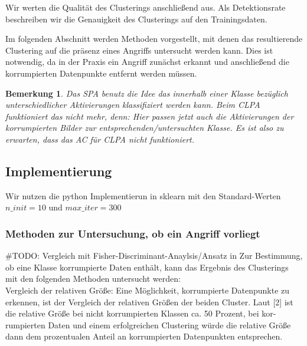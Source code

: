 \documentclass[11pt,a4paper]{article}
\newtheorem{remark}[theorem]{Bemerkung}
\numberwithin{equation}{section}
\begin{document}
		Wir werten die Qualität des Clusterings anschließend aus. Als Detektionsrate
		beschreiben wir die Genauigkeit des Clusterings auf den Trainingsdaten.
		
		Im folgenden Abschnitt werden Methoden vorgestellt, mit denen das resultierende Clustering auf die präsenz eines Angriffs untersucht werden kann. Dies ist notwendig, da in der Praxis ein Angriff zunächst erkannt und anschließend die korrumpierten Datenpunkte entfernt werden müssen. 
		
		\begin{remark}
			Das SPA benutz die Idee das innerhalb einer Klasse bezüglich unterschiedlicher Aktivierungen klassifiziert werden kann. Beim CLPA funktioniert das nicht mehr, denn: Hier passen jetzt auch die Aktivierungen der korrumpierten Bilder zur entsprechenden/untersuchten Klasse. Es ist also zu erwarten, dass das AC für CLPA nicht funktioniert.
		\end{remark}
	
		\subsection{Implementierung}
		Wir nutzen die python Implementierun in sklearn mit den Standard-Werten $n\_init=10$ und $max\_iter=300$
		
		
		\subsubsection{Methoden zur Untersuchung, ob ein Angriff vorliegt}
		\#TODO: Vergleich mit Fisher-Discriminant-Anaylsis/Ansatz in \cite{imagenet_unhansed_v1}
		Zur
		Bestimmung, ob eine Klasse korrumpierte Daten enthält, kann das Ergebnis
		des Clusterings mit den folgenden Methoden untersucht werden:\\
		
		\noindent {}
		{Vergleich der relativen Größe:} Eine Möglichkeit, korrumpierte Datenpunkte
		zu erkennen, ist der Vergleich der relativen Größen der beiden Cluster. Laut [2]
		ist die relative Größe bei nicht korrumpierten Klassen ca. 50 Prozent, bei kor-
		rumpierten Daten und einem erfolgreichen Clustering würde die relative Größe
		dann dem prozentualen Anteil an korrumpierten Datenpunkten entsprechen.\\
		
\end{document}
